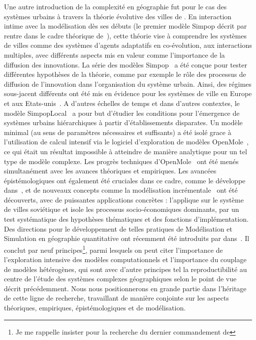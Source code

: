 {Une autre introduction de la complexité en géographie fut pour le cas des systèmes urbains à travers la théorie évolutive des villes de . En interaction intime avec la modélisation dès ses débuts (le premier modèle Simpop décrit par~\cite{sanders1997simpop} rentre dans le cadre théorique de~\cite{pumain1997pour}), cette théorie vise à comprendre les systèmes de villes comme des systèmes d'agents adaptatifs en co-évolution, aux interactions multiples, avec différents aspects mis en valeur comme l'importance de la diffusion des innovations. La série des modèles Simpop~\cite{pumain2012multi} a été conçue pour tester différentes hypothèses de la théorie, comme par exemple le rôle des processus de diffusion de l'innovation dans l'organisation du système urbain. Ainsi, des régimes sous-jacent différents ont été mis en évidence pour les systèmes de ville en Europe et aux Etats-unis~\cite{bretagnolle2010comparer}. A d'autres échelles de temps et dans d'autres contextes, le modèle SimpopLocal~\cite{schmitt2014modelisation} a pour but d'étudier les conditions pour l'émergence de systèmes urbains hiérarchiques à partir d'établissements disparates. Un modèle minimal (au sens de paramètres nécessaires et suffisants) a été isolé grace à l'utilisation de calcul intensif via le logiciel d'exploration de modèles OpenMole~\cite{schmitt2014half}, ce qui était un résultat impossible à atteindre de manière analytique pour un tel type de modèle complexe. Les progrès techniques d'OpenMole~\cite{reuillon2013openmole} ont été menés simultanément avec les avances théoriques et empiriques. Les avancées épistémologiques ont également été cruciales dans ce cadre, comme  le développe dans~\cite{rey2015plateforme}, et de nouveaux concepts comme la modélisation incrémentale~\cite{cottineau2015incremental} ont été découverts, avec de puissantes applications concrètes : \cite{cottineau2014evolution} l'applique sur le système de villes soviétique et isole les processus socio-économiques dominants, par un test systématique des hypothèses thématiques et des fonctions d'implémentation. Des directions pour le développement de telles pratiques de Modélisation et Simulation en géographie quantitative ont récemment été introduits par  dans~\cite{banos2013pour}. Il conclut par neuf principes\footnote{Je me rappelle  insister pour la recherche du dernier commandement de }, parmi lesquels on peut citer l'importance de l'exploration intensive des modèles computationnels et l'importance du couplage de modèles hétérogènes, qui sont avec d'autre principes tel la reproductibilité au centre de l'étude des systèmes complexes géographiques selon le point de vue décrit précédemment. Nous nous positionnerons en grande partie dans l'héritage de cette ligne de recherche, travaillant de manière conjointe sur les aspects théoriques, empiriques, épistémologiques et de modélisation.
}


